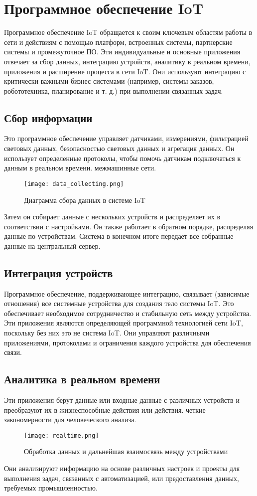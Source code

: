 \section{Программное обеспечение IoT}
Программное обеспечение IoT обращается к своим ключевым областям работы в сети и действиям с помощью платформ, встроенных
системы, партнерские системы и промежуточное ПО. Эти индивидуальные и основные приложения
отвечает за сбор данных, интеграцию устройств, аналитику в реальном времени, приложения и
расширение процесса в сети IoT. Они используют интеграцию с критически важными бизнес-системами
(например, системы заказов, робототехника, планирование и т. д.) при выполнении связанных задач.

\subsection{Сбор информации}
Это программное обеспечение управляет датчиками, измерениями, фильтрацией световых данных, безопасностью световых данных и
агрегация данных. Он использует определенные протоколы, чтобы помочь датчикам подключаться к данным в реальном времени.
межмашинные сети. 
\begin{figure}[h!]
    \centering
    \texttt{[image: data\_collecting.png]}
    \caption{Диаграмма сбора данных в системе IoT}
    \label{fig:section5:data_collecting}
\end{figure}
Затем он собирает данные с нескольких устройств и распределяет их в
соответствии с настройками. Он также работает в обратном порядке, распределяя данные по устройствам. Система
в конечном итоге передает все собранные данные на центральный сервер.

\subsection{Интеграция устройств}
Программное обеспечение, поддерживающее интеграцию, связывает (зависимые отношения) все системные устройства для создания
тело системы IoT. Это обеспечивает необходимое сотрудничество и стабильную сеть между
устройства. Эти приложения являются определяющей программной технологией сети IoT, поскольку
без них это не система IoT. Они управляют различными приложениями, протоколами и
ограничения каждого устройства для обеспечения связи.\cite{IoTAzure}

\subsection{Аналитика в реальном времени}
Эти приложения берут данные или входные данные с различных устройств и преобразуют их в жизнеспособные действия или действия.
четкие закономерности для человеческого анализа. 
\begin{figure}[h!]
    \centering
    \texttt{[image: realtime.png]}
    \caption{Обработка данных и дальнейшая взаимосвязь между устройствами}
    \label{fig:section5:realtime}
\end{figure}
Они анализируют информацию на основе различных настроек и
проекты для выполнения задач, связанных с автоматизацией, или предоставления данных, требуемых промышленностью.

